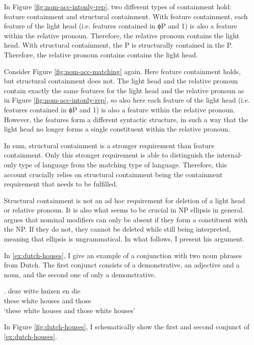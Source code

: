 In Figure \ref{fig:nom-acc-intonly-rep}, two different types of containment hold: feature containment and structural containment.
With feature containment, each feature of the light head (i.e. features contained in ϕP and 1) is also a feature within the relative pronoun. Therefore, the relative pronoun contains the light head.
With structural containment, the P is structurally contained in the P. Therefore, the relative pronoun contains contains the light head.

Consider Figure \ref{fig:nom-acc-matching} again. Here feature containment holds, but structural containment does not.
The light head and the relative pronoun contain exactly the same features for the light head and the relative pronoun as in Figure \ref{fig:nom-acc-intonly-rep}, so also here each feature of the light head (i.e. features contained in ϕP and 1) is also a feature within the relative pronoun.
However, the features form a different syntactic structure, in such a way that the light head no longer forms a single constituent within the relative pronoun.

In sum, structural containment is a stronger requirement than feature containment. Only this stronger requirement is able to distinguish the internal-only type of language from the matching type of language. Therefore, this account crucially relies on structural containment being the containment requirement that needs to be fulfilled.

Structural containment is not an ad hoc requirement for deletion of a light head or relative pronoun. It is also what seems to be crucial in NP ellipsis in general. \citet{cinqueforthcoming} argues that nominal modifiers can only be absent if they form a constituent with the NP. If they do not, they cannot be deleted while still being interpreted, meaning that ellipsis is ungrammatical. In what follows, I present his argument.

In \ref{ex:dutch-houses}, I give an example of a conjunction with two noun phrases from Dutch. The first conjunct consists of a demonstrative, an adjective and a noun, and the second one of only a demonstrative.

\exg. deze witte huizen en die\\
 these white houses and those\\
 `these white houses and those white houses' \label{ex:dutch-houses}

In Figure \ref{fig:dutch-houses}, I schematically show the first and second conjunct of \ref{ex:dutch-houses}.

